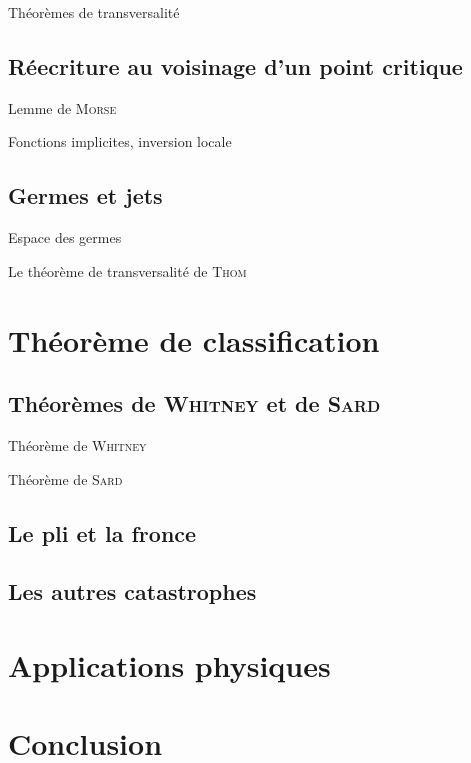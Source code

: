 \documentclass[compress]{beamer}
\theoremstyle{definition}
\begin{document}
\begin{frame}{Théorèmes de transversalité}
\end{frame}

\subsection{Réecriture au voisinage d'un point critique}
\begin{frame}{Lemme de \textsc{Morse}}
\end{frame}
\begin{frame}{Fonctions implicites, inversion locale}
\end{frame}
\subsection{Germes et jets}
\begin{frame}{Espace des germes}
\end{frame}
\begin{frame}{Le théorème de transversalité de \textsc{Thom}}
\end{frame}

\section{Théorème de classification}
\subsection{Théorèmes de \textsc{Whitney} et de \textsc{Sard}}
\begin{frame}{Théorème de \textsc{Whitney}}
\end{frame}
\begin{frame}{Théorème de \textsc{Sard}}
\end{frame}

\subsection{Le pli et la fronce}
\subsection{Les autres catastrophes}

\section{Applications physiques}

\section*{Conclusion}
\frame{}
\end{document}
